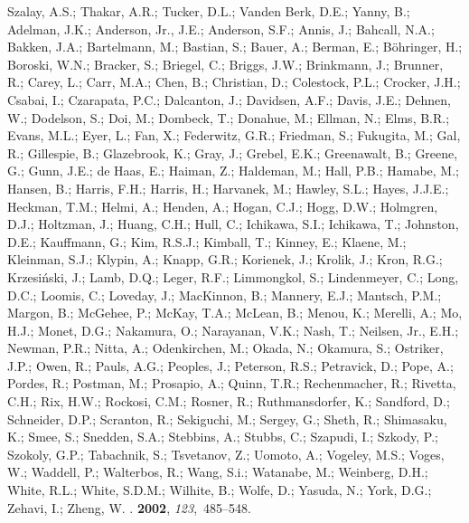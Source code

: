 \begin{thebibliography}{-------}
  {Szalay}, A.S.; {Thakar}, A.R.; {Tucker}, D.L.; {Vanden Berk}, D.E.; {Yanny},
  B.; {Adelman}, J.K.; {Anderson}, Jr., J.E.; {Anderson}, S.F.; {Annis}, J.;
  {Bahcall}, N.A.; {Bakken}, J.A.; {Bartelmann}, M.; {Bastian}, S.; {Bauer},
  A.; {Berman}, E.; {B{\"o}hringer}, H.; {Boroski}, W.N.; {Bracker}, S.;
  {Briegel}, C.; {Briggs}, J.W.; {Brinkmann}, J.; {Brunner}, R.; {Carey}, L.;
  {Carr}, M.A.; {Chen}, B.; {Christian}, D.; {Colestock}, P.L.; {Crocker},
  J.H.; {Csabai}, I.; {Czarapata}, P.C.; {Dalcanton}, J.; {Davidsen}, A.F.;
  {Davis}, J.E.; {Dehnen}, W.; {Dodelson}, S.; {Doi}, M.; {Dombeck}, T.;
  {Donahue}, M.; {Ellman}, N.; {Elms}, B.R.; {Evans}, M.L.; {Eyer}, L.; {Fan},
  X.; {Federwitz}, G.R.; {Friedman}, S.; {Fukugita}, M.; {Gal}, R.;
  {Gillespie}, B.; {Glazebrook}, K.; {Gray}, J.; {Grebel}, E.K.; {Greenawalt},
  B.; {Greene}, G.; {Gunn}, J.E.; {de Haas}, E.; {Haiman}, Z.; {Haldeman}, M.;
  {Hall}, P.B.; {Hamabe}, M.; {Hansen}, B.; {Harris}, F.H.; {Harris}, H.;
  {Harvanek}, M.; {Hawley}, S.L.; {Hayes}, J.J.E.; {Heckman}, T.M.; {Helmi},
  A.; {Henden}, A.; {Hogan}, C.J.; {Hogg}, D.W.; {Holmgren}, D.J.; {Holtzman},
  J.; {Huang}, C.H.; {Hull}, C.; {Ichikawa}, S.I.; {Ichikawa}, T.; {Johnston},
  D.E.; {Kauffmann}, G.; {Kim}, R.S.J.; {Kimball}, T.; {Kinney}, E.; {Klaene},
  M.; {Kleinman}, S.J.; {Klypin}, A.; {Knapp}, G.R.; {Korienek}, J.; {Krolik},
  J.; {Kron}, R.G.; {Krzesi{\'n}ski}, J.; {Lamb}, D.Q.; {Leger}, R.F.;
  {Limmongkol}, S.; {Lindenmeyer}, C.; {Long}, D.C.; {Loomis}, C.; {Loveday},
  J.; {MacKinnon}, B.; {Mannery}, E.J.; {Mantsch}, P.M.; {Margon}, B.;
  {McGehee}, P.; {McKay}, T.A.; {McLean}, B.; {Menou}, K.; {Merelli}, A.; {Mo},
  H.J.; {Monet}, D.G.; {Nakamura}, O.; {Narayanan}, V.K.; {Nash}, T.;
  {Neilsen}, Jr., E.H.; {Newman}, P.R.; {Nitta}, A.; {Odenkirchen}, M.;
  {Okada}, N.; {Okamura}, S.; {Ostriker}, J.P.; {Owen}, R.; {Pauls}, A.G.;
  {Peoples}, J.; {Peterson}, R.S.; {Petravick}, D.; {Pope}, A.; {Pordes}, R.;
  {Postman}, M.; {Prosapio}, A.; {Quinn}, T.R.; {Rechenmacher}, R.; {Rivetta},
  C.H.; {Rix}, H.W.; {Rockosi}, C.M.; {Rosner}, R.; {Ruthmansdorfer}, K.;
  {Sandford}, D.; {Schneider}, D.P.; {Scranton}, R.; {Sekiguchi}, M.; {Sergey},
  G.; {Sheth}, R.; {Shimasaku}, K.; {Smee}, S.; {Snedden}, S.A.; {Stebbins},
  A.; {Stubbs}, C.; {Szapudi}, I.; {Szkody}, P.; {Szokoly}, G.P.; {Tabachnik},
  S.; {Tsvetanov}, Z.; {Uomoto}, A.; {Vogeley}, M.S.; {Voges}, W.; {Waddell},
  P.; {Walterbos}, R.; {Wang}, S.i.; {Watanabe}, M.; {Weinberg}, D.H.; {White},
  R.L.; {White}, S.D.M.; {Wilhite}, B.; {Wolfe}, D.; {Yasuda}, N.; {York},
  D.G.; {Zehavi}, I.; {Zheng}, W.
.
 {\bf 2002}, {\em 123},~485--548.


\end{thebibliography}
